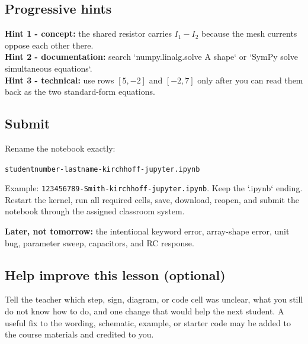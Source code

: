 \documentclass[10pt,letterpaper]{article}
\begin{document}
\subsection*{Progressive hints}

\textbf{Hint 1 - concept:} the shared resistor carries $I_1-I_2$ because the mesh currents oppose each other there.\\
\textbf{Hint 2 - documentation:} search `numpy.linalg.solve A shape` or `SymPy solve simultaneous equations`.\\
\textbf{Hint 3 - technical:} use rows $[5,-2]$ and $[-2,7]$ only after you can read them back as the two standard-form equations.

\subsection*{Submit}

Rename the notebook exactly:

\begin{center}
\texttt{studentnumber-lastname-kirchhoff-jupyter.ipynb}
\end{center}

Example: \texttt{123456789-Smith-kirchhoff-jupyter.ipynb}. Keep the `.ipynb` ending. Restart the kernel, run all required cells, save, download, reopen, and submit the notebook through the assigned classroom system.

\textbf{Later, not tomorrow:} the intentional keyword error, array-shape error, unit bug, parameter sweep, capacitors, and RC response.

\subsection*{Help improve this lesson (optional)}

Tell the teacher which step, sign, diagram, or code cell was unclear, what you still do not know how to do, and one change that would help the next student. A useful fix to the wording, schematic, example, or starter code may be added to the course materials and credited to you.
\end{document}
